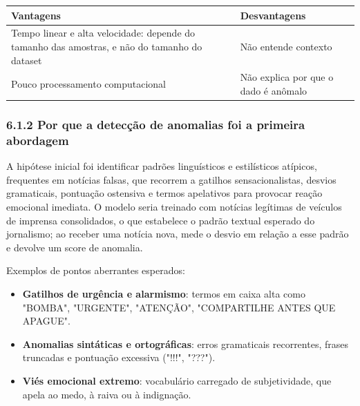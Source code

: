\documentclass[
  brazilian,
  11pt,
]{article}
\newcounter{none} %
\providecommand{\tightlist}{%
  \setlength{\itemsep}{0pt}\setlength{\parskip}{0pt}}
\begin{document}
{\def\LTcaptype{none} %
\begin{longtable}[]{@{}
  >{\raggedright\arraybackslash}p{}
  >{\raggedright\arraybackslash}p{}@{}}
\toprule\noalign{}
\begin{minipage}[b]{\linewidth}\raggedright
Vantagens
\end{minipage} & \begin{minipage}[b]{\linewidth}\raggedright
Desvantagens
\end{minipage} \\
\midrule\noalign{}
\endhead
\bottomrule\noalign{}
\endlastfoot
Tempo linear e alta velocidade: depende do tamanho das amostras, e não do tamanho do dataset & Não entende contexto \\
Pouco processamento computacional & Não explica por que o dado é anômalo \\
\end{longtable}
}

\subsubsection{6.1.2 Por que a detecção de anomalias foi a primeira abordagem}\label{por-que-a-detecuxe7uxe3o-de-anomalias-foi-a-primeira-abordagem}

A hipótese inicial foi identificar padrões linguísticos e estilísticos atípicos, frequentes em notícias falsas, que recorrem a gatilhos sensacionalistas, desvios gramaticais, pontuação ostensiva e termos apelativos para provocar reação emocional imediata. O modelo seria treinado com notícias legítimas de veículos de imprensa consolidados, o que estabelece o padrão textual esperado do jornalismo; ao receber uma notícia nova, mede o desvio em relação a esse padrão e devolve um score de anomalia.

Exemplos de pontos aberrantes esperados:

\begin{itemize}
\tightlist
\item
  \textbf{Gatilhos de urgência e alarmismo}: termos em caixa alta como "BOMBA", "URGENTE", "ATENÇÃO", "COMPARTILHE ANTES QUE APAGUE".
\item
  \textbf{Anomalias sintáticas e ortográficas}: erros gramaticais recorrentes, frases truncadas e pontuação excessiva ("!!!", "???").
\item
  \textbf{Viés emocional extremo}: vocabulário carregado de subjetividade, que apela ao medo, à raiva ou à indignação.
\end{itemize}
\end{document}
